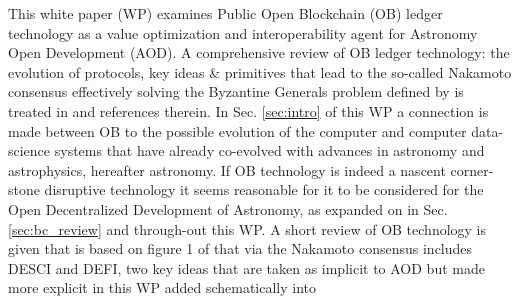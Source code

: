 \documentclass[final,5p,times,twocolumn,authoryear]{elsarticle}
\begin{document}
This white paper (WP) examines Public Open Blockchain (OB) ledger technology as a value optimization and interoperability agent for Astronomy Open Development (AOD). A comprehensive review of OB ledger technology: the evolution of protocols, key ideas \& primitives that lead to the so-called Nakamoto consensus effectively solving the Byzantine Generals problem defined by \cite{Lamport1982TheBG} is treated in  \cite{arvindandclark2017} and references therein. In Sec. \ref{sec:intro} of this WP a connection is made between OB to the possible evolution of the computer and computer data-science systems that have already co-evolved with advances in astronomy and astrophysics, hereafter astronomy. If OB technology is indeed a nascent corner-stone disruptive technology it seems reasonable for it to be considered for the Open Decentralized Development of Astronomy, as expanded on in Sec. \ref{sec:bc_review} and through-out this WP.  A short review of OB technology is given that is based on figure 1 of \cite{arvindandclark2017} that via the Nakamoto consensus includes DESCI and DEFI, two key ideas that are taken as implicit to AOD but made more explicit in this WP added schematically into 
\end{document}
